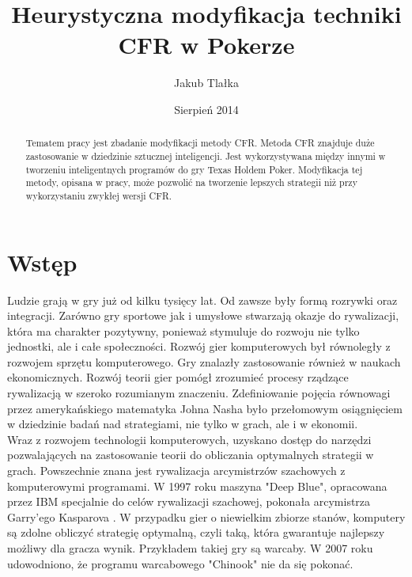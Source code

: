 \documentclass[magisterska]{pracamgr}
\author{Jakub Tlałka}
\title{Heurystyczna modyfikacja techniki CFR w Pokerze}
\date{Sierpień 2014}
\begin{document}
\maketitle

\begin{abstract}
Tematem pracy jest zbadanie modyfikacji metody CFR. Metoda CFR znajduje
duże zastosowanie w dziedzinie sztucznej inteligencji. Jest wykorzystywana między innymi
w tworzeniu inteligentnych programów do gry Texas Holdem Poker. Modyfikacja
tej metody, opisana w pracy, może pozwolić na tworzenie lepszych strategii niż przy wykorzystaniu
zwykłej wersji CFR.
\end{abstract}

\tableofcontents

\chapter{Wstęp}

\noindent
Ludzie grają w gry już od kilku tysięcy lat. Od zawsze były formą rozrywki oraz integracji.
Zarówno gry sportowe jak i umysłowe stwarzają okazje do rywalizacji, która ma charakter pozytywny, ponieważ
stymuluje do rozwoju nie tylko jednostki, ale i całe społeczności. Rozwój gier komputerowych był równoległy
z rozwojem sprzętu komputerowego. Gry znalazły zastosowanie również w naukach
ekonomicznych. Rozwój teorii gier pomógł zrozumieć procesy rządzące rywalizacją w szeroko rozumianym
znaczeniu. Zdefiniowanie pojęcia równowagi przez amerykańskiego matematyka Johna Nasha \cite{nash} było przełomowym
osiągnięciem w dziedzinie badań nad strategiami, nie tylko w grach, ale i w ekonomii. \\

\noindent
Wraz z rozwojem technologii komputerowych, uzyskano dostęp do narzędzi pozwalających na zastosowanie
teorii do obliczania optymalnych strategii w grach. Powszechnie znana jest rywalizacja
arcymistrzów szachowych z komputerowymi programami. W 1997 roku maszyna "Deep Blue", opracowana przez IBM
specjalnie do celów rywalizacji szachowej, pokonała arcymistrza Garry'ego Kasparova \cite{kasparov}. W przypadku gier
o niewielkim zbiorze stanów, komputery są zdolne obliczyć strategię optymalną, czyli taką, która
gwarantuje najlepszy możliwy dla gracza wynik. Przykładem takiej gry są warcaby. W 2007 roku udowodniono, że programu warcabowego
"Chinook" nie da się pokonać. \cite{chinook} \\
\end{document}
